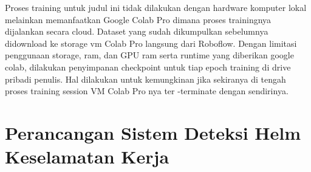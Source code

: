 Proses training untuk judul ini tidak dilakukan dengan hardware komputer lokal melainkan memanfaatkan Google Colab Pro dimana proses trainingnya dijalankan secara cloud. 
Dataset yang sudah dikumpulkan sebelumnya didownload ke storage vm Colab Pro langsung dari Roboflow.  Dengan limitasi penggunaan storage, ram, dan GPU ram serta runtime yang diberikan google colab, dilakukan penyimpanan checkpoint untuk tiap epoch training di drive pribadi penulis. Hal dilakukan untuk kemungkinan jika sekiranya di tengah proses training session VM Colab Pro nya ter -terminate dengan sendirinya. 


\section{Perancangan Sistem Deteksi Helm Keselamatan Kerja}
\label{sec:perancangansistem}

